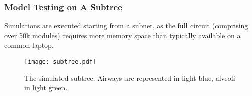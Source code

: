


\subsubsection{Model Testing on A Subtree}
\label{subsubsec:model_testing_on_subtree}

Simulations are executed starting from a subnet, as the full circuit
(comprising over 50k modules) requires more memory space than
typically available on a common laptop.

\begin{figure}[H]
  \centering
  \texttt{[image: subtree.pdf]}
  \caption{The simulated subtree.  Airways are represented in light blue, alveoli in light green.}
  \label{fig:subtree}
\end{figure}



